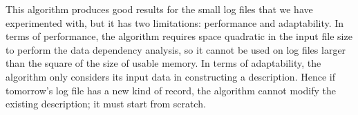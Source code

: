 This algorithm produces good results for the small
log files that we have experimented with, but it has two limitations:
performance and adaptability.  In terms of performance, the algorithm
requires space quadratic in the input file size to perform the data
dependency analysis, so it cannot be used on log files larger than the
square of the size of usable memory.  In terms of adaptability, the
algorithm only considers its input data in constructing a description.
Hence if tomorrow's log file has a new kind of record, the algorithm
cannot modify the existing description; it must start from scratch.


%
%
%
%
